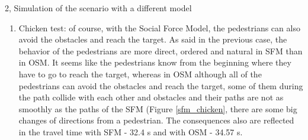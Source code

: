 \documentclass[10pt,a4paper]{article}
\begin{document}
\begin{task}{2, Simulation of the scenario with a different model}
\begin{enumerate}[label=(\alph*)]
    \begin{figure} [H]
    \centering
        \caption{Different stages of the simulation of the scenario 1 using the Gradient Navigation Model}
        \label{scenario6_sfm}
    \end{figure}
    
    \item Chicken test: of course, with the Social Force Model, the pedestrians can also avoid the obstacles and reach the target. As said in the previous case, the behavior of the pedestrians are more direct, ordered and natural in SFM than in OSM. It seems like the pedestrians know from the beginning where they have to go to reach the target, whereas in OSM although all of the pedestrians can avoid the obstacles and reach the target, some of them during the path collide with each other and obstacles and their paths are not as smoothly as the paths of the SFM (Figure \ref{sfm_chicken}, there are some big changes of directions from a pedestrian. The consequences also are reflected in the travel time with SFM - 32.4 s and with OSM - 34.57 s.
    

\end{enumerate}
\end{task}
\end{document}
